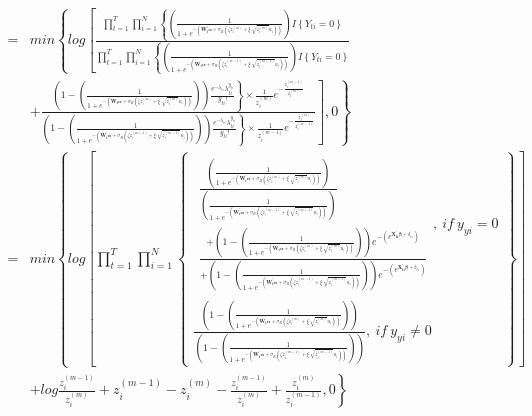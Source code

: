 \documentclass[12pt,a4paper]{article}
\begin{document}
\begin{CJK}{UTF8}{bkai}
\begin{align*}
 = &
 min\left\{log\left[\frac{\prod_{t=1}^T\prod_{i=1}^N \left\{ \left( \frac{1}{1+e^{-(\bm{W_i^\prime}\bm{\alpha}+\sigma_R(\zeta z_i^{(m)}+\xi \sqrt[]{z_i^{(m)}} u_i))}} \right)I\left\{ Y_{ti} = 0\right\}\right.}{\prod_{t=1}^T\prod_{i=1}^N \left\{ \left( \frac{1}{1+e^{-(\bm{W_i^\prime}\bm{\alpha}+\sigma_R(\zeta z_i^{(m-1)}+\xi \sqrt[]{z_i^{(m-1)}} u_i))}} \right)I\left\{ Y_{ti} = 0\right\}\right.}\right.\right. \\[3mm]
 & \left.\left. +\frac{\left.\left(1-\left( \frac{1}{1+e^{-(\bm{W_i^\prime}\bm{\alpha}+\sigma_R(\zeta z_i^{(m)}+\xi \sqrt[]{z_i^{(m)}} u_i))}} \right)\right)\frac{e^{-\lambda_{ti}}\lambda_{ti}^{y_{ti}}}{y_{ti}!}\right\}\times \frac{1}{z_i^{(m)}} e^{-\frac{{z_i^{(m-1)}}}{{z_i^{(m)}}}}}{\left.\left(1-\left( \frac{1}{1+e^{-(\bm{W_i^\prime}\bm{\alpha}+\sigma_R(\zeta z_i^{(m-1)}+\xi \sqrt[]{z_i^{(m-1)}} u_i))}} \right)\right)\frac{e^{-\lambda_{ti}}\lambda_{ti}^{y_{ti}}}{y_{ti}!}\right\}\times \frac{1}{z_i^{(m-1)}} e^{-\frac{{z_i^{(m)}}}{{z_i^{(m-1)}}}}}\right],0\right\} \\[3mm]
 = &
 min\left\{log\left[\prod_{t=1}^T\prod_{i=1}^N
 \begin{Bmatrix}
 \begin{matrix}
 \frac{\left( \frac{1}{1+e^{-(\bm{W_i^\prime}\bm{\alpha}+\sigma_R(\zeta z_i^{(m)}+\xi \sqrt[]{z_i^{(m)}} u_i))}} \right)}{\left( \frac{1}{1+e^{-(\bm{W_i^\prime}\bm{\alpha}+\sigma_R(\zeta z_i^{(m-1)}+\xi \sqrt[]{z_i^{(m-1)}} u_i))}} \right)} \\[3mm]
 \frac{+\left(1-\left( \frac{1}{1+e^{-(\bm{W_i^\prime}\bm{\alpha}+\sigma_R(\zeta z_i^{(m)}+\xi \sqrt[]{z_i^{(m)}} u_i))}} \right)\right)e^{-\left(e^{\bm{X_{ti}^\prime\bm{\beta}}+\delta_{ti}}\right)}}{+\left(1-\left( \frac{1}{1+e^{-(\bm{W_i^\prime}\bm{\alpha}+\sigma_R(\zeta z_i^{(m-1)}+\xi \sqrt[]{z_i^{(m-1)}} u_i))}} \right)\right)e^{-\left(e^{\bm{X_{ti}^\prime\bm{\beta}}+\delta_{ti}}\right)}}
 \end{matrix} , \ if \ y_{yi} = 0 \\
 \frac{\left(1-\left( \frac{1}{1+e^{-(\bm{W_i^\prime}\bm{\alpha}+\sigma_R(\zeta z_i^{(m)}+\xi \sqrt[]{z_i^{(m)}} u_i))}} \right)\right)}{\left(1-\left( \frac{1}{1+e^{-(\bm{W_i^\prime}\bm{\alpha}+\sigma_R(\zeta z_i^{(m-1)}+\xi \sqrt[]{z_i^{(m-1)}} u_i))}} \right)\right)} , \ if \ y_{yi} \ne 0
 \end{Bmatrix}
\right]\right.\\
 &\left. +log\frac{z_i^{(m-1)}}{z_i^{(m)}}+z_i^{(m-1)}-z_i^{(m)}-\frac{z_i^{(m-1)}}{z_i^{(m)}}+\frac{z_i^{(m)}}{z_i^{(m-1)}},0\right\} \\[3mm]

\end{align*}
\end{CJK}
\end{document}
